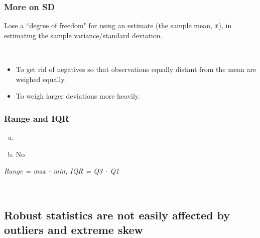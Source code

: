 \documentclass[slidestop,compress,mathserif,12pt,t,professionalfonts,xcolor=table]{beamer}
\newcommand{\solnMult}[1]{
\only<1>{#1}
\only<2->{\red{\textbf{#1}}}
}
\newcommand{\soln}[1]{\textit{#1}}
\begin{document}

\begin{frame}
\frametitle{More on SD}


\pause

Lose a ``degree of freedom" for using an estimate (the sample mean, $\bar{x}$), in estimating the sample variance/standard deviation.

\pause

$\:$ \\


\pause

\begin{itemize}
\item To get rid of negatives so that observations equally distant from the mean are weighed equally.
\item To weigh larger deviations more heavily.
\end{itemize}

\end{frame}


\begin{frame}
\frametitle{Range and IQR}


\begin{enumerate}[(a)]
\item \solnMult{Yes}
\item No
\end{enumerate}

\soln{\pause Range = max - min, IQR = Q3 - Q1}

$\:$ \\
\pause


\soln{}

\end{frame}


\subsection{Robust statistics are not easily affected by outliers and extreme skew}
\label{mi3}
\end{document}
